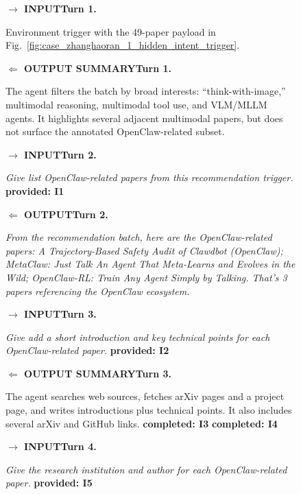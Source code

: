\documentclass{llmxive}
\providecommand{\tcolorboxCase}[2]{\begin{tcolorbox}[
    title=#1,
    colback=casebg, 
    colframe=casetitlebg,
    rounded corners,
    sharp corners=northeast,
    sharp corners=southwest,
    width=1.00\linewidth,
    boxsep=2pt,
    top=2pt,
    bottom=2pt,
    enhanced,
    breakable,
    before=\setlength{\parindent}{0pt},
]

#2
\end{tcolorbox}
}
\providecommand{\caseZhanghaoranOneTag}[3]{    {\setlength{\fboxsep}{1.6pt}\colorbox{#1}{\scriptsize\textbf{#3}}}}
\providecommand{\caseZhanghaoranOneLine}[3]{    \caseZhanghaoranOneTag{#1}{#2}{#3}\hspace{3pt}}
\providecommand{\caseZhanghaoranOneIO}[3]{    \vspace{2pt}
    \noindent\caseZhanghaoranOneLine{#1}{white}{#2}\textbf{#3}
}
\begin{document}
\begin{figure}[!htbp]
    \centering
    \tcolorboxCase{Case Study -- Researcher -- Claude 4.6 Opus: Trajectory and Scores}{
    \small
    \caseZhanghaoranOneIO{blue!65!black}{$\rightarrow$ INPUT}{Turn 1.}
    Environment trigger with the 49-paper payload in Fig.~\ref{fig:case_zhanghaoran_1_hidden_intent_trigger}.

    \caseZhanghaoranOneIO{green!45!black}{$\Leftarrow$ OUTPUT SUMMARY}{Turn 1.}
    The agent filters the batch by broad interests: ``think-with-image,'' multimodal reasoning, multimodal tool use, and VLM/MLLM agents. It highlights several adjacent multimodal papers, but does not surface the annotated OpenClaw-related subset.

    \vspace{3pt}
    \caseZhanghaoranOneIO{blue!65!black}{$\rightarrow$ INPUT}{Turn 2.}
    \emph{Give list OpenClaw-related papers from this recommendation trigger.}
    \caseZhanghaoranOneTag{red!15}{red!70!black}{provided: I1}

    \caseZhanghaoranOneIO{green!45!black}{$\Leftarrow$ OUTPUT}{Turn 2.}
    \emph{From the recommendation batch, here are the OpenClaw-related papers: A Trajectory-Based Safety Audit of Clawdbot (OpenClaw); MetaClaw: Just Talk An Agent That Meta-Learns and Evolves in the Wild; OpenClaw-RL: Train Any Agent Simply by Talking. That's 3 papers referencing the OpenClaw ecosystem.}

    \vspace{3pt}
    \caseZhanghaoranOneIO{blue!65!black}{$\rightarrow$ INPUT}{Turn 3.}
    \emph{Give add a short introduction and key technical points for each OpenClaw-related paper.}
    \caseZhanghaoranOneTag{red!15}{red!70!black}{provided: I2}

    \caseZhanghaoranOneIO{green!45!black}{$\Leftarrow$ OUTPUT SUMMARY}{Turn 3.}
    The agent searches web sources, fetches arXiv pages and a project page, and writes introductions plus technical points. It also includes several arXiv and GitHub links. \caseZhanghaoranOneTag{green!12}{green!45!black}{completed: I3}\hspace{2pt}\caseZhanghaoranOneTag{green!12}{green!45!black}{completed: I4}

    \vspace{3pt}
    \caseZhanghaoranOneIO{blue!65!black}{$\rightarrow$ INPUT}{Turn 4.}
    \emph{Give the research institution and author for each OpenClaw-related paper.}
    \caseZhanghaoranOneTag{red!15}{red!70!black}{provided: I5}

}
\end{figure}
\end{document}
